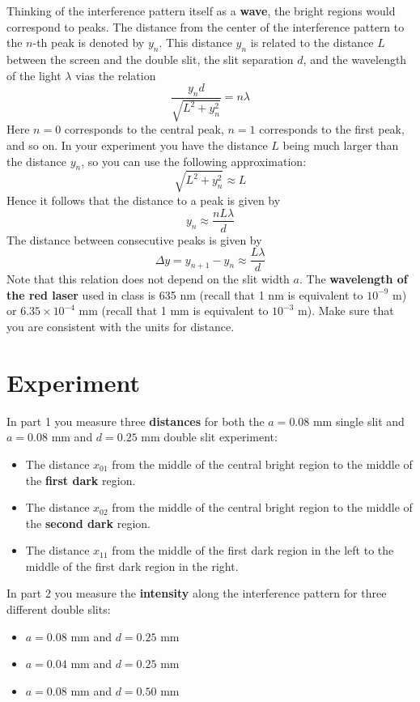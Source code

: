 Thinking of the interference pattern itself as a \textbf{wave}, the bright regions would correspond to peaks. The distance from the center of the interference pattern to the $n$-th peak is denoted by $y_{n}$. This distance $y_{n}$ is related to the distance $L$ between the screen and the double slit, the slit separation $d$, and the wavelength of the light $\lambda$ vias the relation
\begin{equation}
	\frac{y_{n} d}{\sqrt{L^{2} + y_{n}^{2}}} = n \lambda
\end{equation}
Here $n = 0$ corresponds to the central peak, $n = 1$ corresponds to the first peak, and so on. In your experiment you have the distance $L$ being much larger than the distance $y_{n}$, so you can use the following approximation:
\begin{equation}
	\sqrt{L^{2} + y_{n}^{2}} \approx L
\end{equation}
Hence it follows that the distance to a peak is given by
\begin{equation}
	y_{n} \approx \frac{n L \lambda}{d}
\end{equation}
The distance between consecutive peaks is given by
\begin{equation}
	\Delta y = y_{n+1} - y_{n} \approx \frac{L \lambda}{d}
	\label{eq.10.y}
\end{equation}
Note that this relation does not depend on the slit width $a$. The \textbf{wavelength of the red laser} used in class is 635 nm (recall that 1 nm is equivalent to $10^{-9}$ m) or $6.35 \times 10^{-4}$ mm (recall that 1 mm is equivalent to $10^{-3}$ m). Make sure that you are consistent with the units for distance.
\section{Experiment}
In part 1 you measure three \textbf{distances} for both the $a = 0.08$ mm single slit and $a = 0.08$ mm and $d = 0.25$ mm double slit experiment:
\begin{itemize}
	\item The distance $x_{01}$ from the middle of the central bright region to the middle of the \textbf{first dark} region.
	\item The distance $x_{02}$ from the middle of the central bright region to the middle of the \textbf{second dark} region.
	\item The distance $x_{11}$ from the middle of the first dark region in the left to the middle of the first dark region in the right.
\end{itemize}
In part 2 you measure the \textbf{intensity} along the interference pattern for three different double slits:
\begin{itemize}
	\item $a = 0.08$ mm and $d = 0.25$ mm
	\item $a = 0.04$ mm and $d = 0.25$ mm
	\item $a = 0.08$ mm and $d = 0.50$ mm
\end{itemize}
